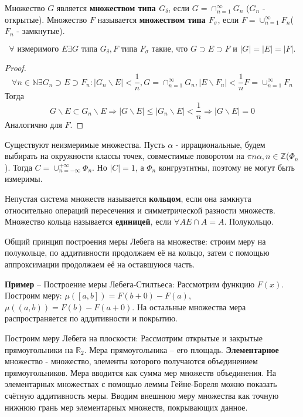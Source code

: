 \documentclass[11pt]{article}
\newcounter{th}\setcounter{th}{0}
\def\th{\par\smallskip\refstepcounter{th}\textbf{\arabic{th}}}
\newtheorem*{Theorem}{Теорема \th}
\begin{document}
Множество $G$ является \textbf{множеством типа $G_\delta$}, если $G = \cap_{n = 1}^{\infty}G_n$
($G_n$ - открытые). Множество $F$ называется \textbf{множеством типа $F_\sigma$}, если
$F = \cup_{n = 1}^{\infty}F_n$($F_n$ - замкнутые).
\begin{Theorem}
\begin{equation*}
\forall \text{ измеримого } E \exists G\text{ типа }G_{\delta}, F\text{ типа }F_{\sigma} \text{ такие,
что } G \supset E \supset F \text{ и } |G| = |E| = |F|.
\end{equation*}
\end{Theorem}
\begin{proof}
\begin{equation*}
\forall n \in \mathbb{N} \exists G_n \supset E \supset F_n: |G_n \backslash E| < \frac1n,
G = \cap_{n = 1}^{\infty}G_n, |E \backslash F_n| < \frac1n F = \cup_{n = 1}^{\infty}F_n
\end{equation*}
Тогда
\begin{equation*}
G \backslash E \subset G_n \backslash E \Rightarrow |G \backslash E| \leq |G_n \backslash E| < \frac1n
\Rightarrow |G \backslash E| = 0
\end{equation*}
Аналогично для $F$.
\end{proof}
Существуют неизмеримые множества. Пусть $\alpha$ - иррациональные, будем выбирать на
окружности классы точек, совместимые поворотом на $\pi n\alpha, n \in \mathbb{Z}$($\Phi_n$). Тогда
$C = \cup_{n = -\infty}^{+\infty}\Phi_n$. Но $|C| = 1$, а $\Phi_n$ конгруэтнтны, поэтому не могут
быть измеримы.

Непустая система множеств называется \textbf{кольцом}, если она замкнута относительно операций
пересечения и симметрической разности множеств. Множество кольца называется \textbf{единицей},
если $\forall A E\cap A = A$. Полукольцо.

Общий принцип построения меры Лебега на множестве: строим меру на полукольце, по аддитивности
продолжаем её на кольцо, затем с помощью аппроксимации продолжаем её на оставшуюся часть.

\textbf{Пример} -- Построение меры Лебега-Стилтьеса:
Рассмотрим функцию $F(x)$. Построим меру: $\mu([a, b]) = F(b + 0) - F(a)$, $\mu((a, b)) = F(b) - F(a + 0)$.
На остальные множества мера распространяется по аддитивности и покрытию.

Построим меру Лебега на плоскости:
Рассмотрим открытые и закрытые прямоугольники на $\mathbb{R}_2$. Мера прямоугольника -- его площадь.
\textbf{Элементарное} множество - множество, элементы которого получаются объединением
прямоугольников. Мера вводится как сумма мер множеств объединения. На элементарных множествах
с помощью леммы Гейне-Бореля можно показать счётную аддитивность меры. Вводим внешнюю меру
множества как точную нижнюю грань мер элементарных множеств, покрывающих данное.
\end{document}
